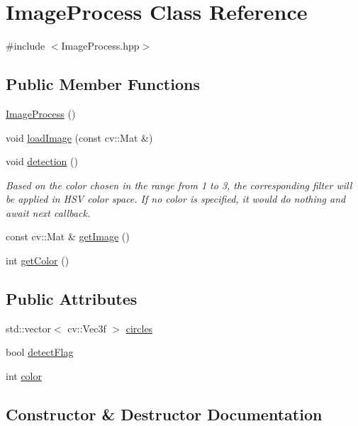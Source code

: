 \hypertarget{classImageProcess}{}\section{Image\+Process Class Reference}
\label{classImageProcess}


{\ttfamily \#include $<$Image\+Process.\+hpp$>$}

\subsection*{Public Member Functions}
\begin{DoxyCompactItemize}
\item 
\hyperlink{classImageProcess_a3dd8d2b73be1d21ccac33921defcf533}{Image\+Process} ()
\item 
void \hyperlink{classImageProcess_a4c08cfba39236fa09ec5f2d0e37452fb}{load\+Image} (const cv\+::\+Mat \&)
\item 
void \hyperlink{classImageProcess_a0a4d4d847095fa9632565ec68b746b4f}{detection} ()
\begin{DoxyCompactList}\small\item\em Based on the color chosen in the range from 1 to 3, the corresponding filter will be applied in H\+SV color space. If no color is specified, it would do nothing and await next callback. \end{DoxyCompactList}\item 
const cv\+::\+Mat \& \hyperlink{classImageProcess_abedcfaaa343e334b5bc09a45e69c92ba}{get\+Image} ()
\item 
int \hyperlink{classImageProcess_a98f98b789934e466c504977d3af3f031}{get\+Color} ()
\end{DoxyCompactItemize}
\subsection*{Public Attributes}
\begin{DoxyCompactItemize}
\item 
std\+::vector$<$ cv\+::\+Vec3f $>$ \hyperlink{classImageProcess_aafcbd180aa8e8dd937f736a43685a6bc}{circles}
\item 
bool \hyperlink{classImageProcess_a265b78fb51ab67a89743dd9c3f85e69b}{detect\+Flag}
\item 
int \hyperlink{classImageProcess_ab96f8c1ee03f6bbf8e60ffa496fdaa0d}{color}
\end{DoxyCompactItemize}


\subsection{Constructor \& Destructor Documentation}
